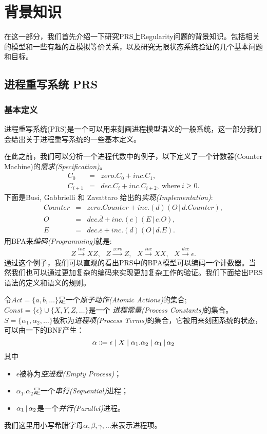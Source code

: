 \chapter{背景知识}
\label{chap:pre}

在这一部分，我们首先介绍一下研究PRS上Regularity问题的背景知识。包括相关的模型和一些有趣的互模拟等价关系，以及研究无限状态系统验证的几个基本问题和目标。

\section{进程重写系统 PRS}
\label{sec:prs}

\subsection{基本定义}
\label{subsec:basic-def}

进程重写系统(PRS)是一个可以用来刻画进程模型语义的一般系统，这一部分我们会给出关于进程重写系统的一些基本定义。\cite{Mayr2000}

在此之前，我们可以分析一个进程代数中的例子\cite{Milner1989}，以下定义了一个计数器(Counter Machine)的\emph{需求(Specification)}。
\begin{eqnarray*}
C_{0} &=& zero.C_{0}+inc.C_{1}, \\
C_{i+1} &=& dec.C_{i}+inc.C_{i+2},\ \mathrm{where}\ i\ge0.
\end{eqnarray*}
下面是Busi, Gabbrielli 和 Zavattaro 给出的\emph{实现(Implementation)}\cite{Busi2003}:
\begin{eqnarray*}
Counter &=& zero.Counter+inc.(d)(O\,|\,d.Counter), \\
O &=& dec.\overline{d}+inc.(e)(E\,|\,e.O), \\
E &=& dec.\overline{e}+inc.(d)(O\,|\,d.E).
\end{eqnarray*}
用BPA来\emph{编码(Programming)}就是:
\[
Z \stackrel{inc}{\longrightarrow} XZ, \ \ \
Z \stackrel{zero}{\longrightarrow} Z, \ \ \
X \stackrel{inc}{\longrightarrow} XX, \ \ \
X \stackrel{dec}{\longrightarrow} \epsilon.
\]
通过这个例子，我们可以直观的看出PRS中的BPA模型可以编码一个计数器。当然我们也可以通过更加复杂的编码来实现更加复杂工作的验证。我们下面给出PRS语法的定义和语义的规则。

\begin{defn}\label{def:process-term}
令$Act=\{a,b,\ldots\}$是一个\emph{原子动作(Atomic Actions)}的集合;$Const=\{\epsilon\}\cup\{X,Y,Z,\ldots\}$是一个 \emph{进程常量(Process Constants)}的集合。
$S=\{\alpha_1,\alpha_2,\ldots\}$被称为\emph{进程项(Process Terms)}的集合，它被用来刻画系统的状态，可以由一下的BNF产生：
$$\alpha\Coloneqq \epsilon\mid X\mid \alpha_1.\alpha_2\mid \alpha_1\,|\, \alpha_2$$
其中
\begin{itemize}
\item $\epsilon$被称为\emph{空进程(Empty Process)}；
\item $\alpha_1.\alpha_2$是一个\emph{串行(Sequential)}进程；
\item $\alpha_1\,|\, \alpha_2$是一个\emph{并行(Parallel)}进程。
\end{itemize}
我们这里用小写希腊字母$\alpha,\beta,\gamma,\ldots$来表示进程项。
\end{defn}

